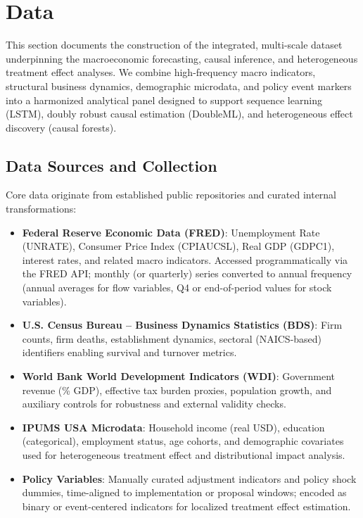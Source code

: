 \section{Data}\label{sec:data}

This section documents the construction of the integrated, multi-scale dataset underpinning the macroeconomic forecasting, causal inference, and heterogeneous treatment effect analyses. We combine high-frequency macro indicators, structural business dynamics, demographic microdata, and policy event markers into a harmonized analytical panel designed to support sequence learning (LSTM), doubly robust causal estimation (DoubleML), and heterogeneous effect discovery (causal forests).

\subsection{Data Sources and Collection}\label{subsec:data_sources}
Core data originate from established public repositories and curated internal transformations:
\begin{itemize}
  \item \textbf{Federal Reserve Economic Data (FRED)}: Unemployment Rate (UNRATE), Consumer Price Index (CPIAUCSL), Real GDP (GDPC1), interest rates, and related macro indicators. Accessed programmatically via the FRED API; monthly (or quarterly) series converted to annual frequency (annual averages for flow variables, Q4 or end-of-period values for stock variables).
  \item \textbf{U.S. Census Bureau -- Business Dynamics Statistics (BDS)}: Firm counts, firm deaths, establishment dynamics, sectoral (NAICS-based) identifiers enabling survival and turnover metrics.
  \item \textbf{World Bank World Development Indicators (WDI)}: Government revenue (\% GDP), effective tax burden proxies, population growth, and auxiliary controls for robustness and external validity checks.
  \item \textbf{IPUMS USA Microdata}: Household income (real USD), education (categorical), employment status, age cohorts, and demographic covariates used for heterogeneous treatment effect and distributional impact analysis.
  \item \textbf{Policy Variables}: Manually curated \VAT{} adjustment indicators and policy shock dummies, time-aligned to implementation or proposal windows; encoded as binary or event-centered indicators for localized treatment effect estimation.
\end{itemize}


